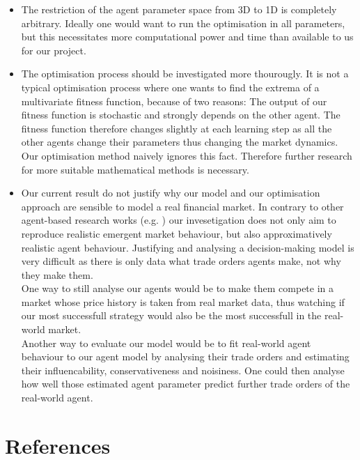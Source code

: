 \documentclass[11pt]{article}
\begin{document}
\begin{itemize}
  \item The restriction of the agent parameter space from 3D to 1D is completely arbitrary. Ideally one would want to run the optimisation in all parameters, but this necessitates more computational power and time than available to us for our project.
  \item The optimisation process should be investigated more thourougly. It is not a typical optimisation process where one wants to find the extrema of a multivariate fitness function, because of two reasons: The output of our fitness function is stochastic and strongly depends on the other agent. The fitness function therefore changes slightly at each learning step as all the other agents change their parameters thus changing the market dynamics. Our optimisation method naively ignores this fact. Therefore further research for more suitable mathematical methods is necessary.
  \item Our current result do not justify why our model and our optimisation approach are sensible to model a real financial market. In contrary to other agent-based research works (e.g. \cite{raberto2001agent}) our invesetigation does not only aim to reproduce realistic emergent market behaviour, but also approximatively realistic agent behaviour. Justifying and analysing a decision-making model is very difficult as there is only data what trade orders agents make, not why they make them. \\
  One way to still analyse our agents would be to make them compete in a market whose price history is taken from real market data, thus watching if our most successfull strategy would also be the most successfull in the real-world market. \\
  Another way to evaluate our model would be to fit real-world agent behaviour to our agent model by analysing their trade orders and estimating their influencability, conservativeness and noisiness. One could then analyse how well those estimated agent parameter predict further trade orders of the real-world agent.
\end{itemize}


\section{References}


\end{document}

